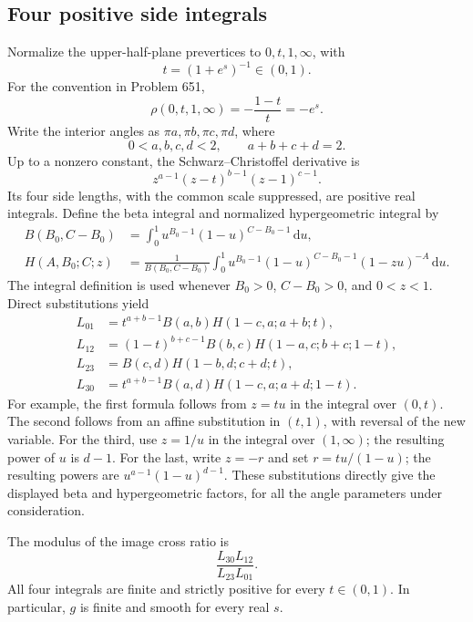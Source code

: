 \documentclass[11pt,a4paper]{article}
\newcommand{\dd}{\,\mathrm d}
\theoremstyle{definition}
\theoremstyle{remark}
\numberwithin{equation}{section}
\begin{document}
\subsection{Four positive side integrals}
Normalize the upper-half-plane prevertices to $0,t,1,\infty$, with
\[
t=(1+e^s)^{-1}\in(0,1).
\]
For the convention in Problem 651,
\[
\rho(0,t,1,\infty)=-\frac{1-t}{t}=-e^s.
\]
Write the interior angles as $\pi a,\pi b,\pi c,\pi d$, where
\[
0<a,b,c,d<2,\qquad a+b+c+d=2.
\]
Up to a nonzero constant, the Schwarz--Christoffel derivative is
\[
z^{a-1}(z-t)^{b-1}(z-1)^{c-1}.
\]
Its four side lengths, with the common scale suppressed, are positive real integrals. Define the beta integral and normalized hypergeometric integral by
\begin{align*}
B(B_0,C-B_0)&=\int_0^1 u^{B_0-1}(1-u)^{C-B_0-1}\dd u,\\
H(A,B_0;C;z)&=\frac{1}{B(B_0,C-B_0)}
\int_0^1u^{B_0-1}(1-u)^{C-B_0-1}(1-zu)^{-A}\dd u.
\end{align*}
The integral definition is used whenever $B_0>0$, $C-B_0>0$, and $0<z<1$. Direct substitutions yield
\begin{align}
L_{01}&=t^{a+b-1}B(a,b)H(1-c,a;a+b;t),\label{eq:side01}\\
L_{12}&=(1-t)^{b+c-1}B(b,c)H(1-a,c;b+c;1-t),\\
L_{23}&=B(c,d)H(1-b,d;c+d;t),\\
L_{30}&=t^{a+b-1}B(a,d)H(1-c,a;a+d;1-t).\label{eq:side30}
\end{align}
For example, the first formula follows from $z=tu$ in the integral over $(0,t)$. The second follows from an affine substitution in $(t,1)$, with reversal of the new variable. For the third, use $z=1/u$ in the integral over $(1,\infty)$; the resulting power of $u$ is $d-1$. For the last, write $z=-r$ and set $r=tu/(1-u)$; the resulting powers are $u^{a-1}(1-u)^{d-1}$. These substitutions directly give the displayed beta and hypergeometric factors, for all the angle parameters under consideration.

The modulus of the image cross ratio is
\[
\frac{L_{30}L_{12}}{L_{23}L_{01}}.
\]
All four integrals are finite and strictly positive for every $t\in(0,1)$. In particular, $g$ is finite and smooth for every real $s$.
\end{document}
